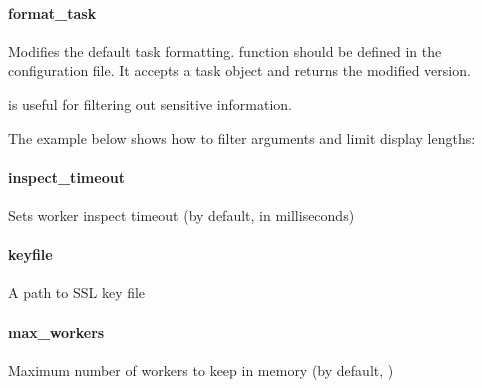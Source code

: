 \documentclass[letterpaper,10pt,english]{sphinxmanual}
\begin{document}
\paragraph{format\_task}
\label{\detokenize{config:format-task}}\label{\detokenize{config:id12}}
Modifies the default task formatting.  function should be
defined in the  configuration file. It accepts a task
object and returns the modified version.

 is useful for filtering out sensitive information.

The example below shows how to filter arguments and limit display lengths:

\begin{sphinxVerbatim}[commandchars=\\\{\}]
   

 
       
       
     
\end{sphinxVerbatim}


\paragraph{inspect\_timeout}
\label{\detokenize{config:inspect-timeout}}\label{\detokenize{config:id13}}
Sets worker inspect timeout (by default, 
in milliseconds)


\paragraph{keyfile}
\label{\detokenize{config:keyfile}}\label{\detokenize{config:id14}}
A path to SSL key file


\paragraph{max\_workers}
\label{\detokenize{config:max-workers}}\label{\detokenize{config:id15}}
Maximum number of workers to keep in memory (by default, )
\end{document}
